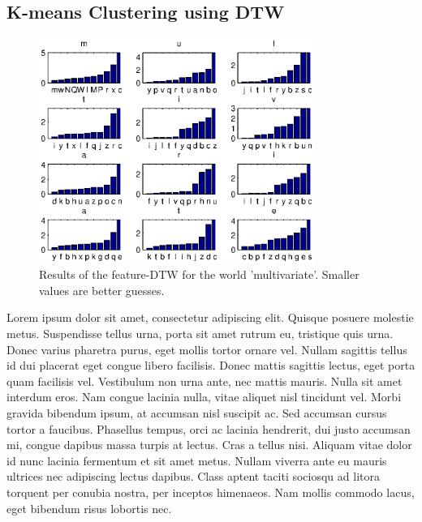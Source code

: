 \documentclass[12pt]{article}
\begin{document}
	\subsection{K-means Clustering using DTW}
	\begin{figure}[htbp!]
	\centering
	\includegraphics[width=0.8\textwidth]{dtw_result.eps}
	\caption{Results of the feature-DTW for the world 'multivariate'. Smaller values are better guesses.}
	\label{figure:dtw_result}
	\end{figure}
	Lorem ipsum dolor sit amet, consectetur adipiscing elit. Quisque posuere molestie metus. Suspendisse tellus urna, porta sit amet rutrum eu, tristique quis urna. Donec varius pharetra purus, eget mollis tortor ornare vel. Nullam sagittis tellus id dui placerat eget congue libero facilisis. Donec mattis sagittis lectus, eget porta quam facilisis vel. Vestibulum non urna ante, nec mattis mauris. Nulla sit amet interdum eros. Nam congue lacinia nulla, vitae aliquet nisl tincidunt vel. Morbi gravida bibendum ipsum, at accumsan nisl suscipit ac. Sed accumsan cursus tortor a faucibus. Phasellus tempus, orci ac lacinia hendrerit, dui justo accumsan mi, congue dapibus massa turpis at lectus. Cras a tellus nisi. Aliquam vitae dolor id nunc lacinia fermentum et sit amet metus. Nullam viverra ante eu mauris ultrices nec adipiscing lectus dapibus. Class aptent taciti sociosqu ad litora torquent per conubia nostra, per inceptos himenaeos. Nam mollis commodo lacus, eget bibendum risus lobortis nec.
	
\end{document}

